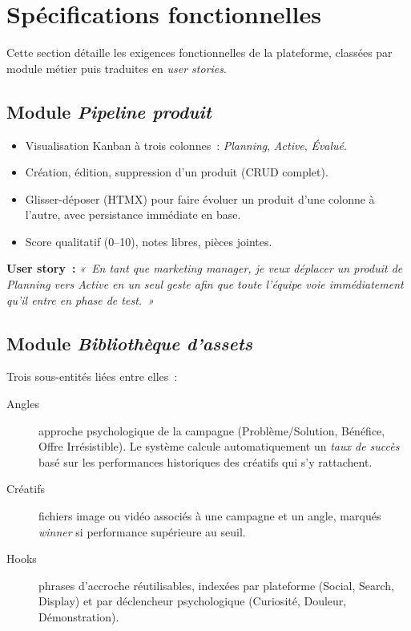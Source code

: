 \section{Spécifications fonctionnelles}
\label{sec:specs-fonc}

Cette section détaille les exigences fonctionnelles de la plateforme,
classées par module métier puis traduites en \emph{user stories}.

\subsection{Module \emph{Pipeline produit}}

\begin{itemize}
    \item Visualisation Kanban à trois colonnes~: \emph{Planning},
    \emph{Active}, \emph{Évalué}.
    \item Création, édition, suppression d'un produit (CRUD complet).
    \item Glisser-déposer (HTMX) pour faire évoluer un produit d'une
    colonne à l'autre, avec persistance immédiate en base.
    \item Score qualitatif (0--10), notes libres, pièces jointes.
\end{itemize}

\textbf{User story~:} \emph{«~En tant que marketing manager, je veux
déplacer un produit de \emph{Planning} vers \emph{Active} en un seul geste
afin que toute l'équipe voie immédiatement qu'il entre en phase de test.~»}

\subsection{Module \emph{Bibliothèque d'assets}}

Trois sous-entités liées entre elles~:

\begin{description}
    \item[Angles] approche psychologique de la campagne (Problème/Solution,
    Bénéfice, Offre Irrésistible). Le système calcule automatiquement un
    \emph{taux de succès} basé sur les performances historiques des
    créatifs qui s'y rattachent.
    \item[Créatifs] fichiers image ou vidéo associés à une campagne et un
    angle, marqués \emph{winner} si performance supérieure au seuil.
    \item[Hooks] phrases d'accroche réutilisables, indexées par plateforme
    (Social, Search, Display) et par déclencheur psychologique (Curiosité,
    Douleur, Démonstration).
\end{description}


